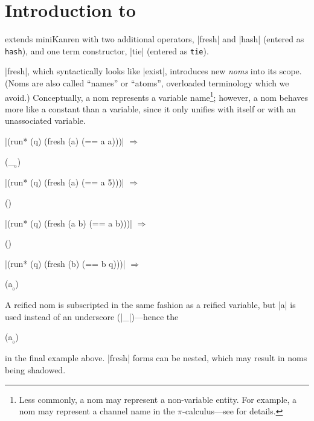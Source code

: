 \section{Introduction to \alphakanren}\label{akintro}
\alphakanrensp extends miniKanren with two additional operators, \scheme|fresh| and \scheme|hash| (entered as {\tt hash}), and one term constructor, \scheme|tie| (entered as {\tt tie}).

\scheme|fresh|, which syntactically looks like \scheme|exist|,
introduces new \emph{noms} into its scope.  (Noms are also called
``names'' or ``atoms'', overloaded terminology which we avoid.)
Conceptually, a nom represents a variable name\footnote{Less commonly,
  a nom may represent a non-variable entity.  For example, a nom may
  represent a channel name in the $\pi$-calculus---see
  \citet{CheneyThesis} for details.}; however, a nom behaves more like
a constant than a variable, since it only unifies with itself or with
an unassociated variable.

\wspace

\noindent\scheme|(run* (q) (fresh (a) (== a a)))| $\Rightarrow$ \begin{schemeresponsebox}(_$_{_{0}}$)\end{schemeresponsebox}

\tspace

\noindent\scheme|(run* (q) (fresh (a) (== a 5)))| $\Rightarrow$ \begin{schemeresponsebox}()\end{schemeresponsebox}

\tspace

\noindent\scheme|(run* (q) (fresh (a b) (== a b)))| $\Rightarrow$ \begin{schemeresponsebox}()\end{schemeresponsebox}

\tspace

\noindent\scheme|(run* (q) (fresh (b) (== b q)))| $\Rightarrow$ \begin{schemeresponsebox}(a$_{_{0}}$)\end{schemeresponsebox}

\wspace

A reified nom is subscripted in the same fashion as a reified
variable, but \schemeresult|a| is used instead
of an underscore (\scheme|_|)---hence
the \begin{schemeresponsebox}(a$_{_{0}}$)\end{schemeresponsebox} in
the final example above.  \scheme|fresh| forms can be nested, which
may result in noms being shadowed.

